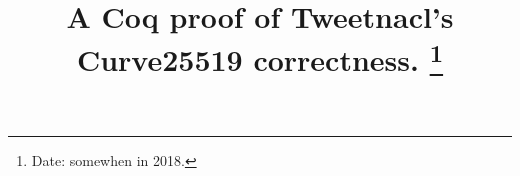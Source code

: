 \documentclass[letterpaper,twocolumn,9pt]{article}
\newif\ifpublic
\begin{document}
\date{}

\title{\Large \bf A Coq proof of Tweetnacl's Curve25519 correctness.%
\thanks{
Date: somewhen in 2018.}
}

\ifpublic
\author{
{\rm Peter Schwabe}\\
  Radboud University, The Netherlands\\
\and
{\rm Beno\^it Viguier}\\
  Radboud University, The Netherlands\\
\and
{\rm Timmy Weerwag}\\
  Radboud University, The Netherlands\\
\and
{\rm Freek Wiedijk}\\
  Radboud University, The Netherlands\\
}
\fi

\maketitle










\vspace*{1cm}
{\footnotesize 
}

\begin{appendix}
\end{appendix}

\listoftodos
\end{document}
